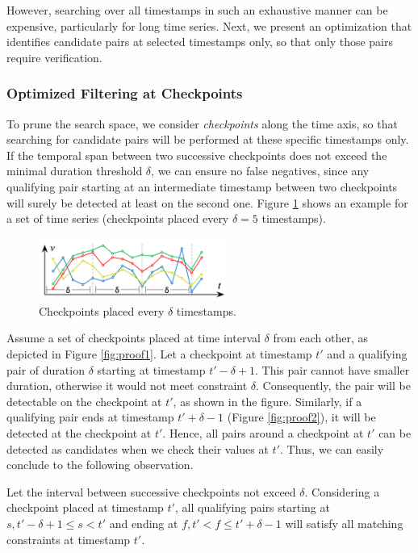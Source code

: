 However, searching over all timestamps in such an exhaustive manner can be expensive, particularly for long time series. Next, we present an optimization that identifies candidate pairs at selected timestamps only, so that only those pairs require verification.

\subsubsection{Optimized Filtering at Checkpoints}
\label{sec:checkpoint_join}

To prune the search space, we consider \textit{checkpoints} along the time axis, so that searching for candidate pairs will be performed at these specific timestamps only. If the temporal span between two successive checkpoints does not exceed the minimal duration threshold $\delta$, we can ensure no false negatives, since any qualifying pair starting at an intermediate timestamp between two checkpoints will surely be detected at least on the second one. Figure \ref{fig:checkpoints} shows an example for a set of time series (checkpoints placed every $\delta=5$ timestamps).

\begin{figure}[!tb]
    \centering
    \includegraphics[width=0.55\textwidth]{figures/checkpoints.png}
    \caption{Checkpoints placed every $\delta$ timestamps.}
    \label{fig:checkpoints}
\end{figure}

Assume a set of checkpoints placed at time interval $\delta$ from each other, as depicted in Figure \ref{fig:proof1}. Let a checkpoint at timestamp $t'$ and a qualifying pair of duration $\delta$ starting at timestamp $t'-\delta+1$. This pair cannot have smaller duration, otherwise it would not meet constraint $\delta$. Consequently, the pair will be detectable on the checkpoint at $t'$, as shown in the figure. Similarly, if a qualifying pair ends at timestamp $t'+\delta-1$ (Figure \ref{fig:proof2}), it will be detected at the checkpoint at $t'$. Hence, all pairs around a checkpoint at $t'$ can be detected as candidates when we check their values at $t'$. Thus, we can easily conclude to the following observation.

\begin{mylemma}
Let the interval between successive checkpoints not exceed $\delta$. Considering a checkpoint placed at timestamp $t'$, all qualifying pairs starting at $s, t'-\delta+1 \leq s < t'$ and ending at $f, t' < f \leq t'+\delta-1$ will satisfy all matching constraints at timestamp $t'$.
\end{mylemma}


